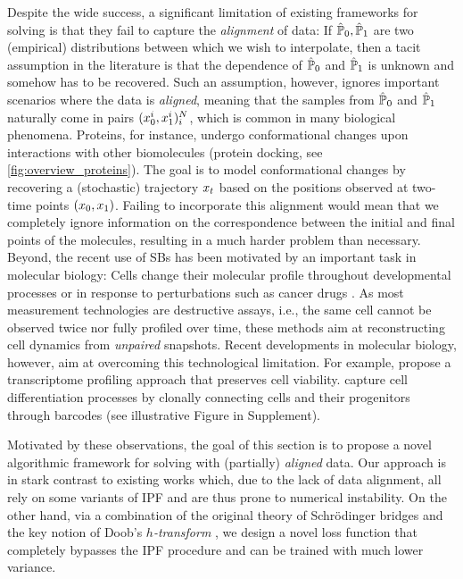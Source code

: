 Despite the wide success, a significant limitation of existing frameworks for solving  is that they fail to capture the \emph{alignment} of data: If $\hat{\mathbb{P}}_{ {0} }, \hat{\mathbb{P}}_{ {1}}$ are two (empirical) distributions between which we wish to interpolate, then a tacit assumption in the literature is that the dependence of $\hat{\mathbb{P}}_{ {0} }$ and $\hat{\mathbb{P}}_{ {1}}$ is unknown and somehow has to be recovered. Such an assumption, however, ignores important scenarios where the data is \emph{aligned}, meaning that the samples from $\hat{\mathbb{P}}_{ {0} }$ and $\hat{\mathbb{P}}_{ {1}}$ naturally come in pairs $(x^i_0,x^i_1)_i^{N}$, which is common in many biological phenomena. Proteins, for instance, undergo conformational changes upon interactions with other biomolecules (protein docking, see \cref{fig:overview_proteins}). The goal is to model conformational changes by recovering a (stochastic) trajectory $x_t$ based on the positions observed at two-time points $\left(x_0, x_1\right)$. Failing to incorporate this alignment would mean that we completely ignore information on the correspondence between the initial and final points of the molecules, resulting in a much harder problem than necessary.
Beyond, the recent use of SBs has been motivated by an important task in molecular biology: Cells change their molecular profile throughout developmental processes \citep{schiebinger2019optimal,bunne2022proximal} or in response to perturbations such as cancer drugs \citep{lotfollahi2019scgen,bunne2021learning}. As most measurement technologies are destructive assays, i.e., the same cell cannot be observed twice nor fully profiled over time, these methods aim at reconstructing cell dynamics from \emph{unpaired} snapshots.
Recent developments in molecular biology, however, aim at overcoming this technological limitation. For example, \citet{chen2022live} propose a transcriptome profiling approach that preserves cell viability. \citet{weinreb2020lineage} capture cell differentiation processes by clonally connecting cells and their progenitors through barcodes (see illustrative Figure in Supplement).

 Motivated by these observations, the goal of this section is to propose a novel algorithmic framework for solving  with (partially) \emph{aligned} data. Our approach is in stark contrast to existing works which, due to the lack of data alignment, all rely on some variants of \acrshort{IPF} \citep{fortet1940resolution, kullback1968probability} and are thus prone to numerical instability. On the other hand, via a combination of the original theory of Schr\"odinger bridges \citep{schrodinger1931umkehrung,leonard2013survey} and the key notion of Doob's \emph{$h$-transform} \citep{doob1984classical, rogers2000diffusions}, we design a novel loss function that completely bypasses the \acrshort{IPF} procedure and can be trained with much lower variance.


